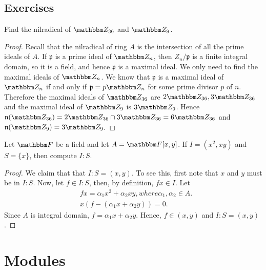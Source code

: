 \newpage
\section{Exercises}
\begin{exercise}
Find the nilradical of $\Z_{36}$ and $\Z_9$.
\end{exercise}
\begin{proof}
Recall that the nilradical of ring $A$ is the intersection of all the prime
ideals of $A$. If $\mathfrak{p}$ is a prime ideal of $\Z_n$, then $Z_n/\mathfrak{p}$ is a finite integral domain, so it is
a field, and hence $\mathfrak{p}$ is a maximal ideal. We only need to find the maximal ideals of
$\Z_n$. We know that $\mathfrak{p}$ is a maximal ideal of $\Z_n$ if and only if $\mathfrak{p} = p\Z_n$ for some prime
divisor $p$ of $n$. Therefore the maximal ideals of $\Z_{36}$ are $2\Z_{36}, 3\Z_{36}$ and the maximal
ideal of $\Z_{9}$ is $3\Z_{9}$. Hence $\mathfrak{n}(\Z_{36}) = 2\Z_{36} \cap 3\Z_{36} = 6\Z_{36}$ and $\mathfrak{n}(\Z_{9}) = 3\Z_{9}$.
\end{proof}


\begin{exercise}
Let $\F$ be a field and let $A = \F[x, y]$. If $I = (x^2, xy)$ and $S = \{x\}$, then compute $I : S$.
\end{exercise}
\begin{proof}
We claim that that $I:S = (x,y)$. To see this, first note that $x$ and $y$ must be in $I : S$. Now, let $f \in I : S$, then, by definition, $f x \in I$. Let
\[
\begin{aligned}
  &f x = \alpha_1 x^2 + \alpha_2 xy, where \alpha_1, \alpha_2 \in A.\\
  &x(f - (\alpha_1 x + \alpha_2 y)) = 0.  
\end{aligned}
\]
Since $A$ is integral domain, $f = \alpha_1 x + \alpha_2 y$. Hence, $f \in (x, y)$ and $I : S = (x, y)$.
\end{proof}
\newpage


\chapter{Modules}

